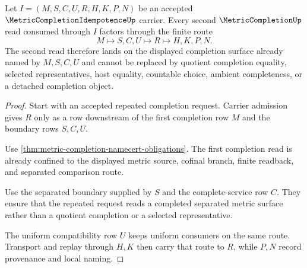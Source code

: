 \begin{theorem}
\label{thm:metric-completion-idempotence-repeated-completion-fixed-point}
Let $I=(M,S,C,U,R,H,K,P,N)$ be an accepted $\MetricCompletionIdempotenceUp$ carrier. Every second $\MetricCompletionUp$ read consumed through $I$ factors through the finite route
$$
M \longmapsto S,C,U \longmapsto R \longmapsto H,K,P,N .
$$
The second read therefore lands on the displayed completion surface already named by $M,S,C,U$ and cannot be replaced by quotient completion equality, selected representatives, host equality, countable choice, ambient completeness, or a detached completion object.
\end{theorem}
\begin{proof}
Start with an accepted repeated completion request. Carrier admission gives $R$ only as a row downstream of the first completion row $M$ and the boundary rows $S,C,U$.

Use \autoref{thm:metric-completion-namecert-obligations}. The first completion read is already confined to the displayed metric source, cofinal branch, finite readback, and separated comparison route.

Use the separated boundary supplied by $S$ and the complete-service row $C$. They ensure that the repeated request reads a completed separated metric surface rather than a quotient completion or a selected representative.

The uniform compatibility row $U$ keeps uniform consumers on the same route. Transport and replay through $H,K$ then carry that route to $R$, while $P,N$ record provenance and local naming.
\end{proof}

